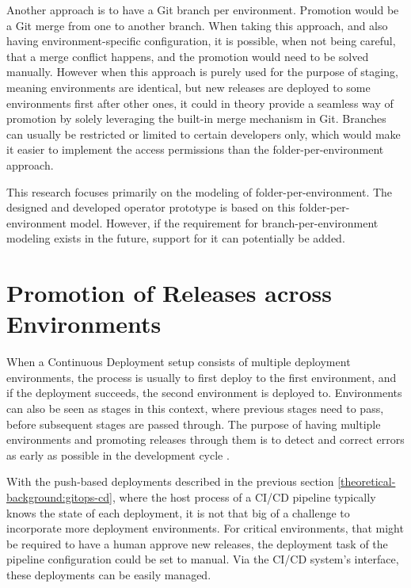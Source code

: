 Another approach is to have a Git branch per environment.
Promotion would be a Git merge from one to another branch.
When taking this approach, and also having environment-specific configuration,
it is possible, when not being careful, that a merge conflict happens,
and the promotion would need to be solved manually.
However when this approach is purely used for the purpose of staging,
meaning environments are identical, but new releases are deployed to some environments first
after other ones,
it could in theory provide a seamless way of promotion by solely leveraging the built-in merge mechanism in Git.
Branches can usually be restricted or limited to certain developers only,
which would make it easier to implement the access permissions than the folder-per-environment approach.

This research focuses primarily on the modeling of folder-per-environment.
The designed and developed operator prototype is based on this folder-per-environment model.
However, if the requirement for branch-per-environment modeling exists in the future,
support for it can potentially be added.








\section{Promotion of Releases across Environments}

When a Continuous Deployment setup consists of multiple deployment environments,
the process is usually to first deploy to the first environment,
and if the deployment succeeds, the second environment is deployed to.
Environments can also be seen as stages in this context,
where previous stages need to pass, before subsequent stages are passed through.
The purpose of having multiple environments and promoting releases through them
is to detect and correct errors as early as possible in the development cycle
\autocite{gitopsAndKubernetes2021continuous}.

With the push-based deployments described in the previous section \ref{theoretical-background:gitops-cd},
where the host process of a CI/CD pipeline typically knows the state of each deployment,
it is not that big of a challenge to incorporate more deployment environments.
For critical environments, that might be required to have a human approve new releases,
the deployment task of the pipeline configuration could be set to manual.
Via the CI/CD system's interface, these deployments can be easily managed.

